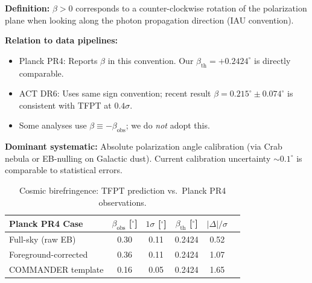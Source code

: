 \begin{tcolorbox}[colback=orange!5, colframe=orange!60!black, 
    title={\textbf{Sign Convention for Birefringence}}, fonttitle=\bfseries\small]
\textbf{Definition:} $\beta > 0$ corresponds to a counter-clockwise rotation of the 
polarization plane when looking along the photon propagation direction (IAU convention).

\textbf{Relation to data pipelines:}
\begin{itemize}[leftmargin=1.5em, topsep=2pt, itemsep=1pt]
    \item Planck PR4: Reports $\beta$ in this convention. Our $\beta_{\text{th}} = +0.2424^\circ$ 
        is directly comparable.
    \item ACT DR6: Uses same sign convention; recent result $\beta = 0.215^\circ \pm 0.074^\circ$ 
        is consistent with TFPT at $0.4\sigma$.
    \item Some analyses use $\beta \equiv -\beta_{\text{obs}}$; we do \emph{not} adopt this.
\end{itemize}

\textbf{Dominant systematic:} Absolute polarization angle calibration (via Crab nebula or 
EB-nulling on Galactic dust). Current calibration uncertainty $\sim 0.1^\circ$ is comparable 
to statistical errors.
\end{tcolorbox}

\begin{table}[H]
\centering
\begin{tabular}{@{}lccccc@{}}
\toprule
\textbf{Planck PR4 Case} & $\beta_{\text{obs}}$ [$^\circ$] & $1\sigma$ [$^\circ$] & 
    $\beta_{\text{th}}$ [$^\circ$] & $|\Delta|/\sigma$\\
\midrule
Full-sky (raw EB) & 0.30 & 0.11 & 0.2424 & 0.52\\
Foreground-corrected & 0.36 & 0.11 & 0.2424 & 1.07\\
COMMANDER template & 0.16 & 0.05 & 0.2424 & 1.65\\
\bottomrule
\end{tabular}
\caption{Cosmic birefringence: TFPT prediction vs.\ Planck PR4 observations.}
\label{tab:birefringence}
\end{table}


